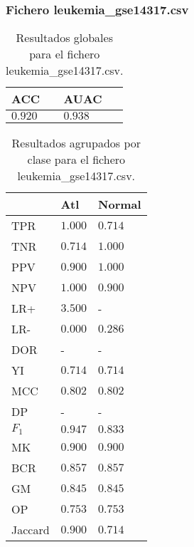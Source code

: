 \clearpage


\subsubsection{Fichero leukemia\_gse14317.csv}

\begin{table}[htp]
    \small
    \centering
    \begin{tabularx}{\columnwidth}{Y Y}
        ACC       & AUAC    \\\hline
        $0.920$   & $0.938$ \\\hline
    \end{tabularx}
    \caption{Resultados globales para el fichero leukemia\_gse14317.csv.}
    \label{tab:20}
\end{table}

\begin{table}[htp]
    \small
    \centering
    \begin{tabularx}{\columnwidth}{l Y Y}
                &  Atl                  & Normal        \\\hline
        TPR     &  $1.000$              & $0.714$       \\\hline
        TNR     &  $0.714$              & $1.000$       \\\hline
        PPV     &  $0.900$              & $1.000$       \\\hline
        NPV     &  $1.000$              & $0.900$       \\\hline
        LR+     &  $3.500$              & -             \\\hline
        LR-     &  $0.000$              & $0.286$       \\\hline
        DOR     &  -                    & -             \\\hline
        YI      &  $0.714$              & $0.714$       \\\hline
        MCC     &  $0.802$              & $0.802$       \\\hline
        DP      &  -                    & -             \\\hline
        $F_{1}$ &  $0.947$              & $0.833$       \\\hline
        MK      &  $0.900$              & $0.900$       \\\hline
        BCR     &  $0.857$              & $0.857$       \\\hline
        GM      &  $0.845$              & $0.845$       \\\hline
        OP      &  $0.753$              & $0.753$       \\\hline
        Jaccard &  $0.900$              & $0.714$       \\\hline
    \end{tabularx}
    \caption{Resultados agrupados por clase para el fichero leukemia\_gse14317.csv.}
    \label{tab:21}
\end{table}

